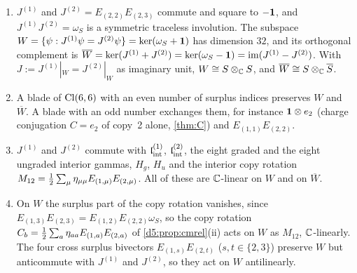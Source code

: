 \begin{proposition}
\label{e1:prop:W}
\begin{enumerate}[label=(\roman*),leftmargin=2.2em]
\item $J^{(1)}$ and $J^{(2)}=E_{(2,2)}E_{(2,3)}$ commute and square to $-\mathbf 1$, and $J^{(1)}J^{(2)}=\omega_S$ is a symmetric traceless involution. The
subspace $W=\{\psi:J^{(1)}\psi=J^{(2)}\psi\}=\ker(\omega_S+\mathbf 1)$ has dimension $32$, and its orthogonal complement is
$\overline W=\ker(J^{(1)}+J^{(2)})=\ker(\omega_S-\mathbf 1)=\operatorname{im}(J^{(1)}-J^{(2)})$. With $J:=J^{(1)}|_W=J^{(2)}|_W$ as imaginary unit,
$W\cong S\otimes_{\mathbb{C}} S$, and $\overline W\cong S\otimes_{\mathbb{C}}\overline S$.
\item A blade of $\mathrm{Cl}(6,6)$ with an even number of surplus indices preserves $W$ and $\overline W$. A blade with an odd number exchanges them,
for instance $\mathbf 1\otimes e_2$ (charge conjugation $C=e_2$ of copy~2 alone, \cref{thm:C}) and $E_{(1,1)}E_{(2,2)}$.
\item $J^{(1)}$ and $J^{(2)}$ commute with $\mathfrak l_{\rm int}^{(1)}$, $\mathfrak l_{\rm int}^{(2)}$, the eight graded and the eight ungraded interior gammas, $H_g$, $H_u$ and the
interior copy rotation $M_{12}=\tfrac12\sum_\mu\eta_{\mu\mu}E_{(1,\mu)}E_{(2,\mu)}$. All of these are $\mathbb{C}$-linear on $W$ and on $\overline W$.
\item On $W$ the surplus part of the copy rotation vanishes, since $E_{(1,3)}E_{(2,3)}=E_{(1,2)}E_{(2,2)}\omega_S$, so the copy rotation
$C_b=\tfrac12\sum_a\eta_{aa}E_{(1,a)}E_{(2,a)}$ of \cref{d5:prop:cmrel}(ii) acts on $W$ as $M_{12}$, $\mathbb{C}$-linearly. The four cross surplus bivectors $E_{(1,s)}E_{(2,t)}$
($s,t\in\{2,3\}$) preserve $W$ but anticommute with $J^{(1)}$ and $J^{(2)}$, so they act on $W$ antilinearly.
\end{enumerate}
\end{proposition}

